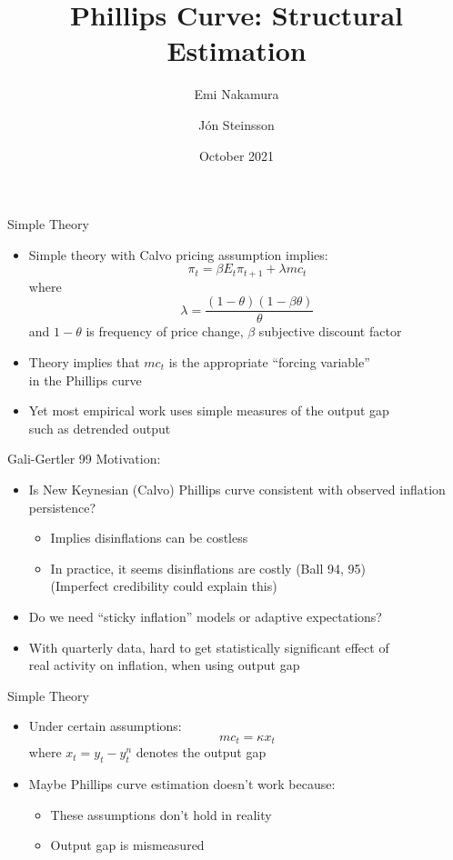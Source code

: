 \documentclass[10pt]{beamer}
\title[Phillips Curve]{Phillips Curve: Structural Estimation}
\author[Nakamura-Steinsson]{Emi Nakamura \and J\'{o}n Steinsson}
\institute[Berkeley]{UC Berkeley}
\date[Oct 2021]{October 2021}
\begin{document}
\begin{frame}
  \titlepage
\end{frame}


\begin{frame}{Simple Theory}
\begin{itemize}
\itemsep1em 
\item Simple theory with Calvo pricing assumption implies:
\[ \pi_{t} = \beta E_{t} \pi_{t+1} + \lambda mc_{t} \]
where
\[ \lambda = \frac{(1-\theta)(1-\beta\theta)}{\theta} \]
and $1-\theta$ is frequency of price change, $\beta$ subjective discount factor
\item Theory implies that $mc_{t}$ is the appropriate ``forcing variable'' \\ in the Phillips curve
\item Yet most empirical work uses simple measures of the output gap \\ such as detrended output
\end{itemize}
\end{frame}

\begin{frame}{Gali-Gertler 99}
	Motivation:
	\begin{itemize}
		\itemsep1em 
		\item Is New Keynesian (Calvo) Phillips curve consistent with observed inflation persistence?
		\begin{itemize}
			\item Implies disinflations can be costless
			\item In practice, it seems disinflations are costly (Ball 94, 95) \\ (Imperfect credibility could explain this)
		\end{itemize}
		\item Do we need ``sticky inflation'' models or adaptive expectations?
		\item With quarterly data, hard to get statistically significant effect of \\ real activity on inflation, when using output gap
	\end{itemize}
\end{frame}

\begin{frame}{Simple Theory}
\begin{itemize}
\itemsep1em 
\item Under certain assumptions:
\[ mc_{t} = \kappa x_{t} \]
where $x_{t} = y_{t} - y_{t}^{n}$ denotes the output gap
\item Maybe Phillips curve estimation doesn't work because:
\begin{itemize}
\item These assumptions don't hold in reality
\item Output gap is mismeasured
\end{itemize}
\end{itemize}
\end{frame}
\end{document}
